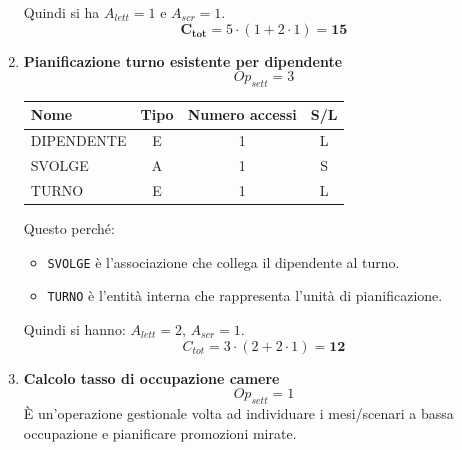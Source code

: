 \documentclass[a4paper,12pt]{report}
\begin{document}
\begin{enumerate}
	      Quindi si ha $A_{lett}=1$ e $A_{scr}=1$.
	      $$\mathbf{C_{tot}} = 5 \cdot (1 + 2 \cdot 1) = \mathbf{15}$$

	\item {\large \textbf{Pianificazione turno esistente per dipendente}} \label{op18}
	      $$
		      Op_{sett} = 3
	      $$

	      \begin{table}[H]
		      \centering
		      \small
		      \renewcommand{\arraystretch}{1.15}
		      \begin{tabularx}{0.8\textwidth}{|X|c|c|c|}
			      \hline
			      \rowcolor{gray!20}
			      \textbf{Nome} & \textbf{Tipo} & \textbf{Numero accessi} & \textbf{S/L} \\
			      \hline
			      DIPENDENTE    & E             & 1                       & L            \\
			      SVOLGE        & A             & 1                       & S            \\
			      TURNO         & E             & 1                       & L            \\
			      \hline
		      \end{tabularx}
	      \end{table}


	      Questo perché:
	      \begin{itemize}
		      \item \texttt{SVOLGE} è l'associazione che collega il dipendente al turno.
		      \item \texttt{TURNO} è l'entità interna che rappresenta l'unità di pianificazione.
	      \end{itemize}

	      Quindi si hanno: $A_{lett}=2$, $A_{scr}=1$.
	      $$C_{tot} = 3 \cdot (2 + 2 \cdot 1) = \mathbf{12}$$


	\item {\large \textbf{Calcolo tasso di occupazione camere}} \label{op19}
	      $$
		      {Op}_{sett} = 1
	      $$
	      È un'operazione gestionale volta ad individuare i mesi/scenari a bassa occupazione e pianificare promozioni mirate.


\end{enumerate}
\end{document}
